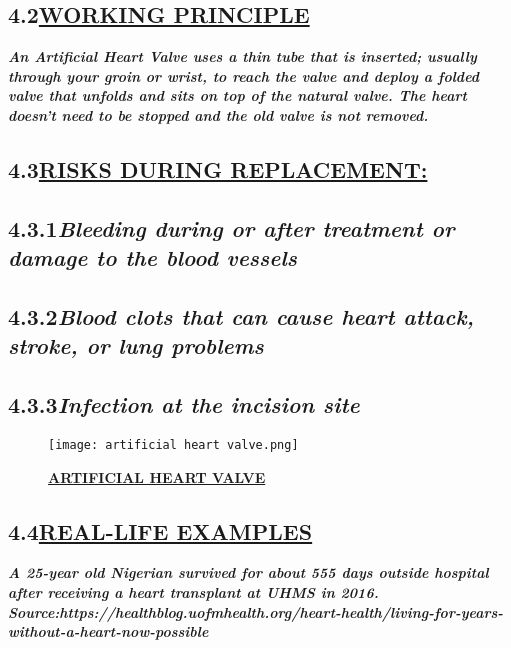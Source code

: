 \documentclass[12pt]{article}
\begin{document}
\subsection*{\hspace{1cm}\textbf{4.2\hspace{1cm}\underline{\LARGE{WORKING PRINCIPLE}}}}
\hspace{1cm}\large{\emph{\textbf{An Artificial Heart Valve uses a thin tube that is inserted; usually through your groin or wrist, to reach the valve and deploy a folded valve that unfolds and sits on top of the natural valve. The heart doesn't need to be stopped and the old valve is not removed.}}}
\vspace{2cm}
\subsection*{\hspace{1cm}\textbf{4.3\hspace{1cm}\underline{\LARGE{RISKS DURING REPLACEMENT:}}}}
\subsection*{\hspace{2cm}\textbf{4.3.1\hspace{1cm}\emph{\large{Bleeding during or after treatment or damage to the blood vessels}}}}
\subsection*{\hspace{2cm}\textbf{4.3.2\hspace{1cm}\emph{\large{Blood clots that can cause heart attack, stroke, or lung problems}}}}
\subsection*{\hspace{2cm}\textbf{4.3.3\hspace{1cm}\emph{\large{Infection at the incision site}}}}

\begin{figure}
    \centering
    \texttt{[image: artificial heart valve.png]}
    \caption{\textbf{\underline{ARTIFICIAL HEART VALVE}}}
    \label{fig:4}
\end{figure}
\vspace{1cm}
\subsection*{\hspace{1cm}\textbf{4.4\hspace{1cm}\underline{\LARGE{REAL-LIFE EXAMPLES}}}}
\hspace{1cm}\large{\emph{\textbf{A 25-year old Nigerian survived for about 555 days outside hospital after receiving a heart transplant at UHMS in 2016.
\break Source:https://healthblog.uofmhealth.org/heart-health/living-for-years-without-a-heart-now-possible}}} 
\end{document}
